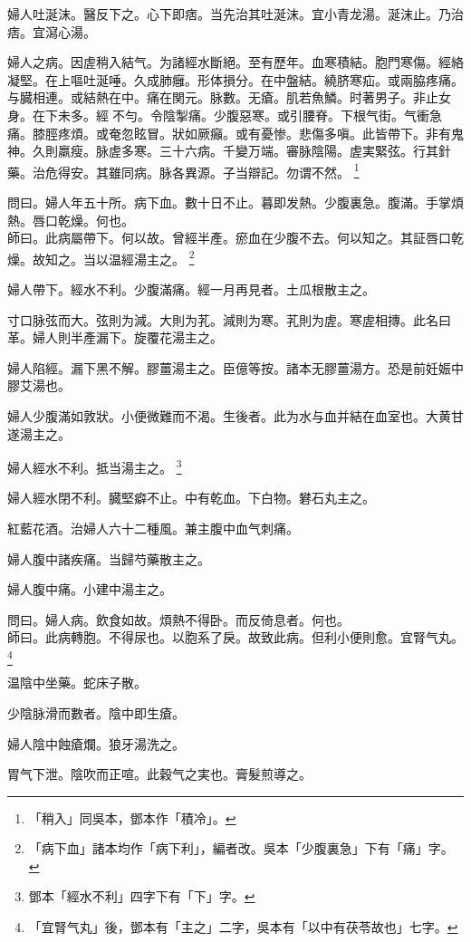 婦人吐涎沫。醫反下之。心下即痞。当先治其吐涎沫。宜小青龙湯。涎沫止。乃治痞。宜瀉心湯。

婦人之病。因虗稍入結气。为諸經水斷絕。至有歷年。血寒積結。胞門寒傷。經絡凝堅。在上嘔吐涎唾。久成肺癰。形体損分。在中盤結。繞脐寒疝。或兩脇疼痛。与臓相連。或結熱在中。痛在関元。脉數。无瘡。肌若魚鱗。时著男子。非止女身。在下未多。經{\sungtpii 𠊱}不勻。令陰掣痛。少腹惡寒。或引腰脊。下根气街。气衝急痛。膝脛疼煩。或奄忽眩冒。狀如厥癲。或有憂惨。悲傷多嗔。此皆帶下。非有鬼神。久則羸瘦。脉虗多寒。三十六病。千變万端。審脉陰陽。虗実緊弦。行其針藥。治危得安。其雖同病。脉各異源。子当辯記。勿谓不然。
	\footnote{「稍入」同吳本，鄧本作「積冷」。}

問曰。婦人年五十所。病下血。數十日不止。暮即发熱。少腹裏急。腹滿。手掌煩熱。唇口乾燥。何也。\\
師曰。此病屬帶下。何以故。曾經半產。瘀血在少腹不去。何以知之。其証唇口乾燥。故知之。当以温經湯主之。
	\footnote{
		「病下血」諸本均作「病下利」，編者改。吳本「少腹裏急」下有「痛」字。
	}

{\khaaitp 婦人}帶下。經水不利。少腹滿痛。經一月再見者。土瓜根散主之。

寸口脉弦而大。弦則为減。大則为芤。減則为寒。芤則为虗。寒虗相摶。此名曰革。婦人則半產漏下。旋覆花湯主之。

婦人陷經。漏下黑不解。膠薑湯主之。{\scriptsize 臣億等按。諸本无膠薑湯{\khaaitp 方}。恐是前妊娠中膠艾湯也。}

婦人少腹滿如敦狀。小便微難而不渴。生後者。此为水与血并結在血室也。大黄甘遂湯主之。

婦人經水不利。抵当湯主之。
	\footnote{鄧本「經水不利」四字下有「下」字。}

婦人經水閉不利。臓堅癖不止。中有乾血。下白物。礬石丸主之。

紅藍花酒。治婦人六十二種風。兼主腹中血气刺痛。

婦人腹中諸疾痛。当歸芍藥散主之。

婦人腹中痛。小建中湯主之。

問曰。婦人病。飲食如故。煩熱不得卧。而反倚息者。何也。\\
師曰。此病轉胞。不得尿也。以胞系了戾。故致此病。但利小便則愈。宜腎气丸。
	\footnote{「宜腎气丸」後，鄧本有「主之」二字，吳本有「以中有茯苓故也」七字。}

温陰中坐藥。蛇床子散。

少陰脉滑而數者。陰中即生瘡。

{\khaaitp 婦人}陰中蝕瘡爛。狼牙湯洗之。

胃气下泄。陰吹而正喧。此穀气之実也。膏髮煎導之。

